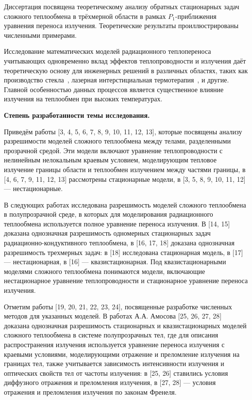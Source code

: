 Диссертация посвящена теоретическому анализу обратных стационарных
задач сложного теплообмена в трёхмерной области в рамках $P_1$-приближения
уравнения переноса излучения.
Теоретические результаты проиллюстрированы численными примерами.


Исследование математических моделей радиационного теплопереноса учитывающих одновременно
вклад эффектов теплопроводности и излучения даёт теоретическую основу для инженерных решений в различных областях,
таких как производство стекла~\cite{glass}, лазерная интерстициальная термотерапия~\cite{therapy}, и другие.
Главной особенностью данных процессов является существенное влияние излучения на теплообмен при высоких температурах.


\textbf{Степень разработанности темы исследования.}

Приведём работы [3, 4, 5, 6, 7, 8, 9, 10, 11, 12, 13], которые посвящены анализу разрешимости моделей сложного
теплообмена между телами, разделенными прозрачной средой.
Эти модели включают уравнение теплопроводности с нелинейным нелокальным краевым условием,
моделирующим тепловое излучение границы области и теплообмен излучением между частями границы,
в [4, 6, 7, 9, 11, 12, 13] рассмотрены стационарные модели, в [3, 5, 8, 9, 10, 11, 12] — нестационарные.

В следующих работах исследована разрешимость моделей сложного теплообмена в полупрозрачной среде,
в которых для моделирования радиационного теплообмена используется полное уравнение переноса излучения.
В [14, 15] доказана однозначная разрешимость одномерных стационарных задач радиационно-кондуктивного
теплообмена, в [16, 17, 18] доказана однозначная разрешимость трехмерных задач: в [18]
исследована стационарная модель, в [17] — нестационарная, в [16] — квазистационарная.
Под квазистационарными моделями сложного теплообмена понимаются модели, включающие нестационарное
уравнение теплопроводности и стационарное уравнение переноса излучения.

Отметим работы [19, 20, 21, 22, 23, 24], посвященные разработке численных методов для указанных моделей.
В работах А.А. Амосова [25, 26, 27, 28] доказана однозначная разрешимость стационарных и квазистационарных
моделей сложного теплообмена в системе полупрозрачных тел, где для описания распространения излучения используется
уравнение переноса излучения с краевыми условиями, моделирующими отражение и преломление излучения
на границах тел, также учитывается зависимость интенсивности излучения и оптических свойств тел от частоты
излучения: в [25, 26] ставились условия диффузного отражения и преломления излучения, в [27, 28] — условия отражения
и преломления излучения по законам Френеля.


